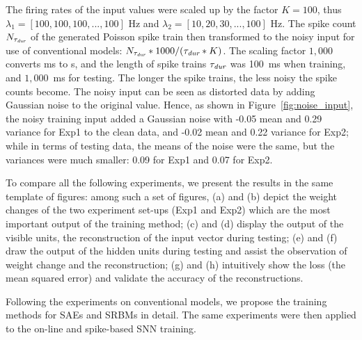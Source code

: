 The firing rates of the input values were scaled up by the factor $K = 100$, thus $\lambda_1 = [100, 100, 100, ..., 100]$ Hz and $\lambda_2 = [10, 20, 30, ..., 100]$ Hz.
The spike count $N_{\tau_{\textit{\textrm{dur}}}}$ of the generated Poisson spike train then transformed to the noisy input for use of conventional models: $N_{\tau_{\textit{\textrm{dur}}}}*1000/(\tau_{\textit{\textrm{dur}}} * K)$.
The scaling factor $1,000$ converts ms to s, and the length of spike trains $\tau_{\textit{\textrm{dur}}}$ was 100~ms when training, and $1,000$~ms for testing.
The longer the spike trains, the less noisy the spike counts become.
The noisy input can be seen as distorted data by adding Gaussian noise to the original value.
Hence, as shown in Figure~\ref{fig:noise_input}, the noisy training input added a Gaussian noise with -0.05 mean and 0.29 variance for Exp1 to the clean data, and -0.02 mean and 0.22 variance for Exp2;
while in terms of testing data, the means of the noise were the same, but the variances were much smaller: 0.09 for Exp1 and 0.07 for Exp2.


To compare all the following experiments, we present the results in the same template of figures:
among such a set of figures, (a) and (b) depict the weight changes of the two experiment set-ups (Exp1 and Exp2) which are the most important output of the training method;
(c) and (d) display the output of the visible units, the reconstruction of the input vector during testing;
(e) and (f) draw the output of the hidden units during testing and assist the observation of weight change and the reconstruction;
(g) and (h) intuitively show the loss (the mean squared error) and validate the accuracy of the reconstructions.

Following the experiments on conventional models, we propose the training methods for SAEs and SRBMs in detail.
The same experiments were then applied to the on-line and spike-based SNN training.

